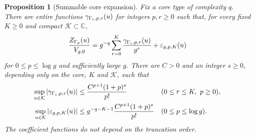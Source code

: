 \documentclass[a4paper,10pt]{article}
\numberwithin{equation}{section}
\theoremstyle{paperplain}
\newtheorem{prp}[thm]{Proposition}
\theoremstyle{paperremark}
\theoremstyle{paperplain}
\begin{document}
\begin{prp}[Summable core expansion]
\label{prp:s03:core-expansion}
Fix a core type of complexity $q$. There are entire functions
$\gamma_{\Gamma_{\rm c},p,r}(u)$ for integers $p,r\geq0$ such
that, for every fixed $K\geq0$ and compact
$\mathcal K\subset\mathbb C$,
\begin{equation}
\label{eq:s03:core-expansion}
\frac{Z_{\Gamma_p}(u)}{V_{g,0}}
=g^{-q}\sum_{r=0}^K\frac{\gamma_{\Gamma_{\rm c},p,r}(u)}{g^r}
 +\varepsilon_{g,p,K}(u)
\end{equation}
for $0\leq p\leq\log g$ and sufficiently large $g$.
There are $C>0$ and an integer $s\geq0$, depending only on the
core, $K$ and $\mathcal K$, such that
\begin{equation}
\label{eq:s03:summable-remainder}
\begin{aligned}
\sup_{u\in\mathcal K}|\gamma_{\Gamma_{\rm c},p,r}(u)|
 &\leq\frac{C^{p+1}(1+p)^s}{p!}
       &&(0\leq r\leq K,\ p\geq0),\\
\sup_{u\in\mathcal K}|\varepsilon_{g,p,K}(u)|
 &\leq g^{-q-K-1}\frac{C^{p+1}(1+p)^s}{p!}
       &&(0\leq p\leq\log g).
\end{aligned}
\end{equation}
The coefficient functions do not depend on the truncation order.
\end{prp}
\end{document}
